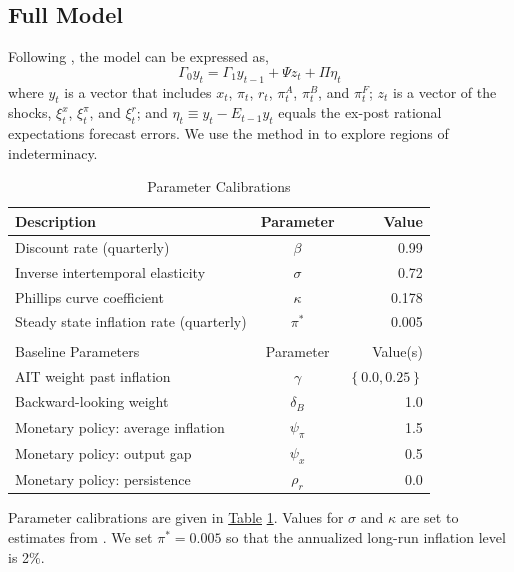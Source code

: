 \documentclass[english,authoryear,12pt]{elsarticle}
\begin{document}
\subsection{Full Model}

Following \citet{sims2002}, the model can be expressed as,
\begin{equation}
	\Gamma_0 y_t = \Gamma_1 y_{t-1} + \Psi z_t + \Pi \eta_t
\end{equation}
where $y_t$ is a vector that includes $x_t$, $\pi_t$, $r_t$, $\pi_t^A$, $\pi_t^B$, and $\pi_t^F$; $z_t$ is a vector of the shocks, $\xi_t^x$, $\xi_t^\pi$, and $\xi_t^r$; and $\eta_t \equiv y_t - E_{t-1} y_t$ equals the ex-post rational expectations forecast errors. We use the method in \citet{sims2002} to explore regions of indeterminacy.

\begin{table}[htp]
	\captionsetup{justification=centering}
	\caption{Parameter Calibrations}\label{tb:parms}
	\begin{center}
		\vspace*{-1pc}\begin{tabular}{lcr}
			Description & Parameter & Value \\ \hline
			Discount rate (quarterly) & $\beta$ & 0.99 \\
			Inverse intertemporal elasticity & $\sigma$ & 0.72 \\
			Phillips curve coefficient & $\kappa$ & 0.178 \\
			Steady state inflation rate (quarterly) & $\pi^*$ & 0.005 \\ [0.25pc]
			\hline \\ [-0.25pc]
			Baseline Parameters & Parameter & Value(s) \\ \hline
			AIT weight past inflation & $\gamma$ & $\left\{ 0.0, 0.25 \right\}$ \\
			Backward-looking weight & $\delta_B$ & 1.0 \\
			Monetary policy: average inflation & $\psi_\pi$ & 1.5 \\
			Monetary policy: output gap & $\psi_x$ & 0.5 \\
			Monetary policy: persistence & $\rho_r$ & 0.0 \\ \hline
		\end{tabular}
	\end{center}
\end{table}

Parameter calibrations are given in \href{tb:parms}{Table} \ref{tb:parms}. Values for $\sigma$ and $\kappa$ are set to estimates from \citet{smetswouters2007}. We set $\pi^*=0.005$ so that the annualized long-run inflation level is 2\%.
\end{document}
